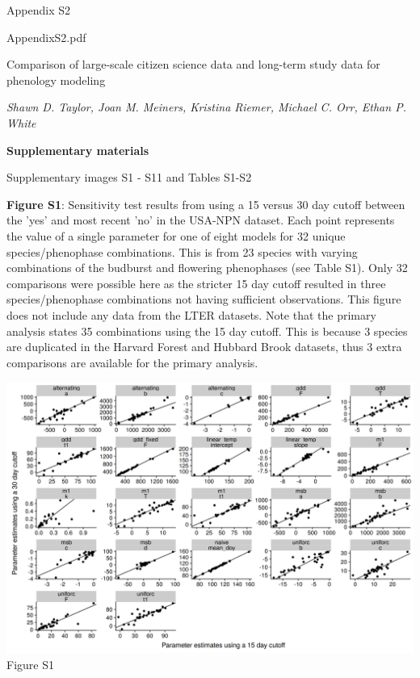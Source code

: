 \documentclass[a4paper,12pt]{article}
\begin{document}
\Large
Appendix S2

AppendixS2.pdf

Comparison of large-scale citizen science data and long-term study data for phenology modeling

\normalsize
\textit{Shawn D. Taylor, Joan M. Meiners, Kristina Riemer, Michael C. Orr, Ethan P. White}

\textbf{\large Supplementary materials}

Supplementary images S1 - S11 and Tables S1-S2


\newpage

\textbf{Figure S1}: Sensitivity test results from using a 15 versus 30 day cutoff between the 'yes' and most recent 'no' in the USA-NPN dataset. Each point represents the value of a single parameter for one of eight models for 32 unique species/phenophase combinations. This is from 23 species with varying combinations of the budburst and flowering phenophases (see Table S1). Only 32 comparisons were possible here as the stricter 15 day cutoff resulted in three species/phenophase combinations not having sufficient observations. This figure does not include any data from the LTER datasets. Note that the primary analysis states 35 combinations using the 15 day cutoff. This is because 3 species are duplicated in the Harvard Forest and Hubbard Brook datasets, thus 3 extra comparisons are available for the primary analysis. 

\newpage

\begin{center}
	\centering
		\includegraphics[width=1\textwidth]{figure_s1_parameter_estimates_from_cutoff_sensitivity.png}
	Figure S1
\end{center}
\end{document}
